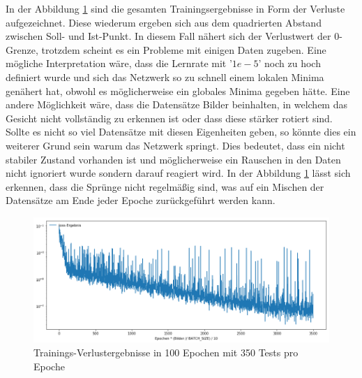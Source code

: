In der Abbildung \ref{fig:lossDiag} sind die gesamten Trainingsergebnisse in Form der Verluste aufgezeichnet. 
Diese wiederum ergeben sich aus dem quadrierten Abstand zwischen Soll- und Ist-Punkt.
In diesem Fall nähert sich der Verlustwert der $0$-Grenze, trotzdem scheint es ein Probleme mit einigen Daten zugeben. 
Eine mögliche Interpretation wäre, dass die Lernrate mit '$1e-5$' noch zu hoch definiert wurde und sich das Netzwerk so zu schnell einem lokalen Minima genähert hat, obwohl es möglicherweise ein globales Minima gegeben hätte. 
Eine andere Möglichkeit wäre, dass die Datensätze Bilder beinhalten, in welchem das Gesicht nicht vollständig zu erkennen ist oder dass diese stärker rotiert sind. 
Sollte es nicht so viel Datensätze mit diesen Eigenheiten geben, so könnte dies ein weiterer Grund sein warum das Netzwerk springt. 
Dies bedeutet, dass ein nicht stabiler Zustand vorhanden ist und möglicherweise ein Rauschen in den Daten nicht ignoriert wurde sondern darauf reagiert wird.
In der Abbildung \ref{fig:lossDiag} lässt sich erkennen, dass die Sprünge nicht regelmäßig sind, was auf ein Mischen der Datensätze am Ende jeder Epoche zurückgeführt werden kann. 
\begin{figure}[ht!]
	\centering
	\includegraphics[scale=0.4]{images/loss-diagram-all-new.png}
	\caption{Trainings-Verlustergebnisse in 100 Epochen mit 350 Tests pro Epoche}
	\label{fig:lossDiag}
\end{figure} \phantom \newline

